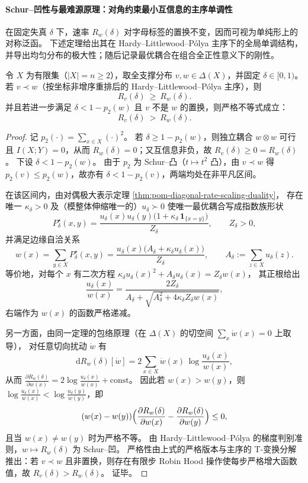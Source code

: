 
\paragraph{Schur--凹性与最难源原理：对角约束最小互信息的主序单调性}
在固定失真 \(\delta\) 下，速率 \(R_w(\delta)\) 对字母标签的置换不变，因而可视为单纯形上的对称泛函。
下述定理给出其在 Hardy--Littlewood--Pólya 主序下的全局单调结构，并导出均匀分布的极大性；随后记录最优耦合在组合全正性意义下的刚性。

\begin{theorem}\label{thm:pom-diagonal-rate-schur-concavity-tp2}
令 \(X\) 为有限集（\(|X|=n\ge 2\)），取全支撑分布 \(v,w\in\Delta(X)\)，并固定 \(\delta\in[0,1)\)。
若 \(v\prec w\)（按坐标非增序重排后的 Hardy--Littlewood--Pólya 主序），则
\[
R_v(\delta)\ \ge\ R_w(\delta).
\]
并且若进一步满足 \(\delta<1-p_2(w)\) 且 \(v\) 不是 \(w\) 的置换，则严格不等式成立：
\[
R_v(\delta)\ >\ R_w(\delta).
\]
\end{theorem}
\begin{proof}
记 \(p_2(\cdot)=\sum_{x\in X}(\cdot)^2\)。
若 \(\delta\ge 1-p_2(w)\)，则独立耦合 \(w\otimes w\) 可行且 \(I(X;Y)=0\)，从而 \(R_w(\delta)=0\)；又互信息非负，故 \(R_v(\delta)\ge 0=R_w(\delta)\)。
下设 \(\delta<1-p_2(w)\)。
由于 \(p_2\) 为 Schur--凸（\(t\mapsto t^2\) 凸），由 \(v\prec w\) 得 \(p_2(v)\le p_2(w)\)，故亦有 \(\delta<1-p_2(v)\)，两端均处在非平凡区间。
\par
在该区间内，由对偶极大表示定理 \ref{thm:pom-diagonal-rate-scaling-duality}，
存在唯一 \(\kappa_\delta>0\) 及（模整体伸缩唯一的）\(u_\delta\succ0\) 使唯一最优耦合写成指数族形状
\[
P^\star_\delta(x,y)=\frac{u_\delta(x)u_\delta(y)\bigl(1+\kappa_\delta\,\mathbf 1_{\{x=y\}}\bigr)}{Z_\delta},
\qquad Z_\delta>0,
\]
并满足边缘自洽关系
\[
w(x)=\sum_{y\in X}P^\star_\delta(x,y)=\frac{u_\delta(x)\bigl(A_\delta+\kappa_\delta u_\delta(x)\bigr)}{Z_\delta},
\qquad
A_\delta:=\sum_{z\in X}u_\delta(z).
\]
等价地，对每个 \(x\) 有二次方程
\(
\kappa_\delta u_\delta(x)^2+A_\delta u_\delta(x)=Z_\delta w(x)
\)，
其正根给出
\[
\frac{u_\delta(x)}{w(x)}
=
\frac{2Z_\delta}{A_\delta+\sqrt{A_\delta^2+4\kappa_\delta Z_\delta w(x)}},
\]
右端作为 \(w(x)\) 的函数严格递减。
\par
另一方面，由同一定理的包络原理（在 \(\Delta(X)\) 的切空间 \(\sum_x \dot w(x)=0\) 上取导），
对任意切向扰动 \(\dot w\) 有
\[
\mathrm d R_w(\delta)[\dot w]=2\sum_{x\in X}\dot w(x)\,\log\frac{u_\delta(x)}{w(x)},
\]
从而
\(
\frac{\partial R_w(\delta)}{\partial w(x)}=2\log\frac{u_\delta(x)}{w(x)}+\mathrm{const}
\)。
因此若 \(w(x)>w(y)\)，则 \(\log\frac{u_\delta(x)}{w(x)}<\log\frac{u_\delta(y)}{w(y)}\)，即
\[
(w(x)-w(y))\Bigl(\frac{\partial R_w(\delta)}{\partial w(x)}-\frac{\partial R_w(\delta)}{\partial w(y)}\Bigr)\le 0,
\]
且当 \(w(x)\ne w(y)\) 时为严格不等。
由 Hardy--Littlewood--Pólya 的梯度判别准则，\(w\mapsto R_w(\delta)\) 为 Schur--凹。
严格性由上式的严格版本与主序的 T-变换分解推出：若 \(v\prec w\) 且非置换，则存在有限步 Robin Hood 操作使每步严格增大函数值，故 \(R_v(\delta)>R_w(\delta)\)。
证毕。
\end{proof}


